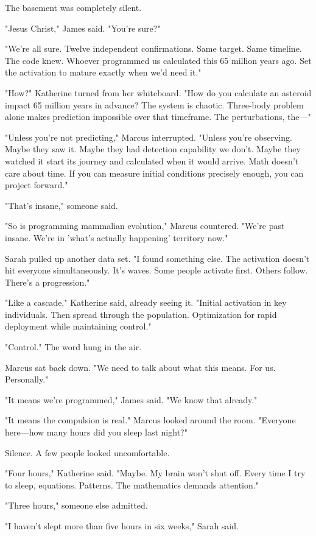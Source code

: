 The basement was completely silent.

"Jesus Christ," James said. "You're sure?"

"We're all sure. Twelve independent confirmations. Same target. Same timeline. The code knew. Whoever programmed us calculated this 65 million years ago. Set the activation to mature exactly when we'd need it."

"How?" Katherine turned from her whiteboard. "How do you calculate an asteroid impact 65 million years in advance? The system is chaotic. Three-body problem alone makes prediction impossible over that timeframe. The perturbations, the—"

"Unless you're not predicting," Marcus interrupted. "Unless you're observing. Maybe they saw it. Maybe they had detection capability we don't. Maybe they watched it start its journey and calculated when it would arrive. Math doesn't care about time. If you can measure initial conditions precisely enough, you can project forward."

"That's insane," someone said.

"So is programming mammalian evolution," Marcus countered. "We're past insane. We're in 'what's actually happening' territory now."

Sarah pulled up another data set. "I found something else. The activation doesn't hit everyone simultaneously. It's waves. Some people activate first. Others follow. There's a progression."

"Like a cascade," Katherine said, already seeing it. "Initial activation in key individuals. Then spread through the population. Optimization for rapid deployment while maintaining control."

"Control." The word hung in the air.

Marcus sat back down. "We need to talk about what this means. For us. Personally."

"It means we're programmed," James said. "We know that already."

"It means the compulsion is real." Marcus looked around the room. "Everyone here—how many hours did you sleep last night?"

Silence. A few people looked uncomfortable.

"Four hours," Katherine said. "Maybe. My brain won't shut off. Every time I try to sleep, equations. Patterns. The mathematics demands attention."

"Three hours," someone else admitted.

"I haven't slept more than five hours in six weeks," Sarah said.

